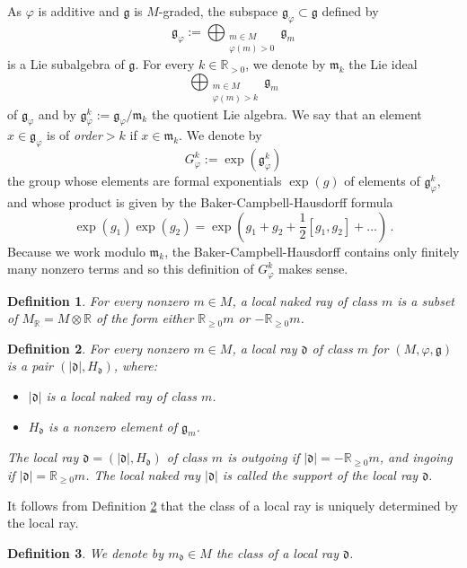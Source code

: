 \documentclass[12pt, a4paper]{amsart}
\newtheorem{defn}{Definition}[section]
\newcommand\R{\mathbb R}
\newcommand\fd{\mathfrak d}
\newcommand\fg{\mathfrak g}
\newcommand\fm{\mathfrak m}
\begin{document}
As $\varphi$ is additive and $\fg$ is $M$-graded, the subspace $\fg_\varphi \subset \fg$ defined by 
\[ \fg_\varphi := \bigoplus_{\substack{m \in M\\ \varphi(m)>0}} \fg_m\]
is a Lie subalgebra of $\fg$.
For every $k \in \R_{>0}$, we denote by
$\fm_k$ the Lie ideal 
\[ \bigoplus_{\substack{m \in M\\\varphi(m)>k}} \fg_m\]
of
$\fg_{\varphi}$ and by $\fg_{\varphi}^k := \fg_{\varphi}/\fm_k$ the quotient Lie algebra. We say that an element $x \in \fg_\varphi$ is of \emph{order}$>k$
if $x \in \fm_k$.
We denote by 
\[ G_\varphi^k := \exp(\fg_{\varphi}^k)\] the group whose elements are formal exponentials $\exp(g)$ of elements of $\fg_{\varphi}^k$, and whose product is given by the Baker-Campbell-Hausdorff formula
\[ \exp(g_1) \exp(g_2)=\exp(g_1+g_2+\frac{1}{2}[g_1,g_2]+\dots)\,. \]
Because we work modulo $\fm_k$, the Baker-Campbell-Hausdorff contains only finitely many nonzero terms and so this definition of $G_{\varphi}^k$ makes sense.


\begin{defn} \label{def_local_naked_ray}
For every nonzero $m \in M$, a \emph{local naked ray of class $m$} is a subset of $M_\R=M \otimes \R$ of the form either 
$\R_{\geqslant 0}m$ or $-\R_{\geqslant 0}m$.
\end{defn}

\begin{defn} \label{def_local_ray}
For every nonzero $m \in M$, a \emph{local ray $\fd$ of class $m$} 
for
$(M, \varphi,
\fg)$ is a pair 
$(|\fd| , H_\fd)$, where: 
\begin{itemize}
    \item[(i)] $|\fd|$ is a local naked ray of class $m$.
    \item[(ii)] $H_\fd$ is a nonzero element of $\fg_m$.
\end{itemize}
The local ray $\fd=(|\fd|, H_\fd)$ of class $m$ is \emph{outgoing} if 
$|\fd| = -\R_{\geqslant 0}m$, and \emph{ingoing} if 
$|\fd|=\R_{\geqslant 0} m$.
The local naked ray $|\fd|$ is called the support of the local ray $\fd$.
\end{defn}

It follows from Definition 
\ref{def_local_ray} that the class of a local ray is uniquely determined by the local ray. 

\begin{defn}
We denote by $m_\fd \in M$ the class of a local ray $\fd$.
\end{defn}
\end{document}
